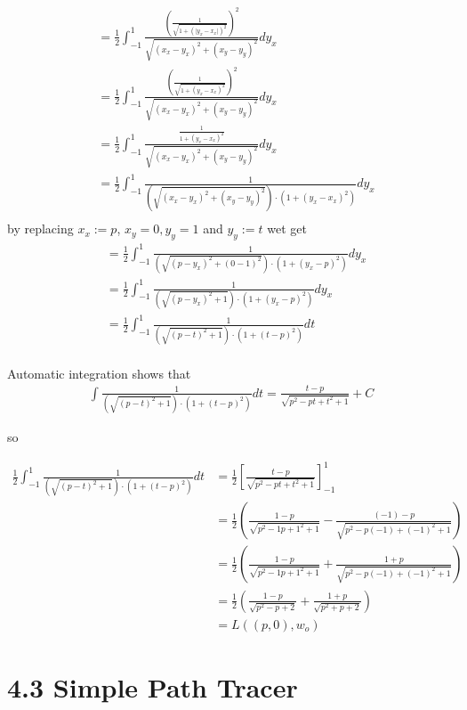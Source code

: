 \documentclass[a4paper]{scrartcl}
\begin{document}
\begin{align*}
  &= \frac{1}{2} \int_{-1}^{1} \frac{\left(\frac{1}{\sqrt{1 + (\lvert y_x - x_x \rvert)^2}}\right)^2}{\sqrt{(x_x - y_x)^2 + (x_y - y_y)^2}} d y_x \\
  &= \frac{1}{2} \int_{-1}^{1} \frac{\left(\frac{1}{\sqrt{1 + ( y_x - x_x )^2}}\right)^2}{\sqrt{(x_x - y_x)^2 + (x_y - y_y)^2}} d y_x \\
  &= \frac{1}{2} \int_{-1}^{1} \frac{\frac{1}{1 + ( y_x - x_x )^2}}{\sqrt{(x_x - y_x)^2 + (x_y - y_y)^2}} d y_x \\
  &= \frac{1}{2} \int_{-1}^{1} \frac{1}{(\sqrt{(x_x - y_x)^2 + (x_y - y_y)^2}) \cdot (1 + ( y_x - x_x )^2)} d y_x \\
\end{align*}
by replacing $x_x := p$, $x_y = 0, y_y=1$ and $y_y:=t$ wet get
\begin{align*}
  &= \frac{1}{2} \int_{-1}^{1} \frac{1}{(\sqrt{(p - y_x)^2 + (0 - 1)^2}) \cdot (1 + ( y_x - p)^2)} d y_x \\
  &= \frac{1}{2} \int_{-1}^{1} \frac{1}{(\sqrt{(p - y_x)^2 + 1}) \cdot (1 + ( y_x - p)^2)} d y_x \\
  &= \frac{1}{2} \int_{-1}^{1} \frac{1}{(\sqrt{(p - t)^2 + 1}) \cdot (1 + ( t- p)^2)} d t \\
\end{align*}


Automatic integration shows that
\begin{align*}
  \int \frac{1}{(\sqrt{(p - t)^2 + 1}) \cdot (1 + ( t- p)^2)} dt = \frac{t-p}{\sqrt{p^2 - pt + t^2 + 1}} + C
\end{align*}

so

\begin{align*}
  \frac{1}{2} \int_{-1}^{1} \frac{1}{(\sqrt{(p - t)^2 + 1}) \cdot (1 + ( t- p)^2)} d t 
  &= \frac{1}{2}\left[ \frac{t-p}{\sqrt{p^2 - pt + t^2 + 1}} \right]_{-1}^{1} \\
  &= \frac{1}{2} \left( \frac{1-p}{\sqrt{p^2 - 1 p + 1^2 + 1}} -  \frac{(-1)-p}{\sqrt{p^2 - p (-1) + (-1)^2 + 1}} \right)\\
  &= \frac{1}{2} \left( \frac{1-p}{\sqrt{p^2 - 1 p + 1^2 + 1}} + \frac{1+p}{\sqrt{p^2 - p (-1) + (-1)^2 + 1}} \right)\\
  &= \frac{1}{2} \left( \frac{1-p}{\sqrt{p^2 - p + 2}} + \frac{1+p}{\sqrt{p^2 + p + 2}} \right)\\
  &= L((p,0), w_o)
\end{align*}

\section*{4.3 Simple Path Tracer}
\end{document}
